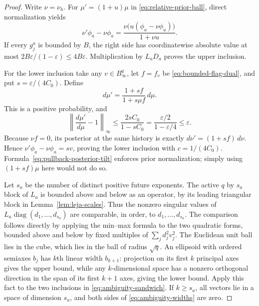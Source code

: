 \documentclass[11pt]{amsart}
\theoremstyle{definition}\newtheorem{definition}[theorem]{Definition}
\theoremstyle{remark}\newtheorem{remark}[theorem]{Remark}
\begin{document}
\begin{proof}
Write $\nu=\nu_h$. For $\mu'=(1+u)\mu$ in
\eqref{eq:relative-prior-ball}, direct normalization yields
\[
 \nu'\phi_a-\nu\phi_a
 =\frac{\nu\bigl(u(\phi_a-\nu\phi_a)\bigr)}{1+\nu u}.
\]
If every $g_j^a$ is bounded by $B$, the right side has coordinatewise
absolute value at most $2B\varepsilon/(1-\varepsilon)\le4B\varepsilon$.
Multiplication by $L_aD_a$ proves the upper inclusion.

For the lower inclusion take any $v\in B_\infty^q$, let $f=f_v$ be
\eqref{eq:bounded-flag-dual}, and put $s=\varepsilon/(4C_0)$. Define
\begin{equation}\label{eq:pullback-posterior-tilt}
 d\mu' =\frac{1+s f}{1+s\mu f}\,d\mu.
\end{equation}
This is a positive probability, and
\[
 \left\|\frac{d\mu'}{d\mu}-1\right\|_\infty
 \le\frac{2s C_0}{1-s C_0}
 =\frac{\varepsilon/2}{1-\varepsilon/4}\le\varepsilon.
\]
Because $\nu f=0$, its posterior at the same history is exactly
$d\nu'=(1+s f)\,d\nu$. Hence
$\nu'\phi_a-\nu\phi_a=s v$, proving the lower inclusion with
$c=1/(4C_0)$. Formula~\eqref{eq:pullback-posterior-tilt} enforces prior
normalization; simply using $(1+s f)\mu$ here would not do so.

Let $s_a$ be the number of distinct positive future exponents. The active
$q$ by $s_a$ block of $L_a$ is bounded above and below as an operator,
by its leading triangular block in Lemma~\ref{lem:leja-scales}.
Thus the nonzero singular values of
$L_a\operatorname{diag}(d_1,\ldots,d_{s_a})$ are comparable, in order,
to $d_1,\ldots,d_{s_a}$. The comparison follows directly by applying
the min--max formula to the two quadratic forms, bounded above and below
by fixed multiples of $\sum_jd_j^2v_j^2$.
The Euclidean unit ball lies in the cube, which lies in the ball of
radius $\sqrt q$. An ellipsoid with ordered semiaxes $b_j$ has $k$th
linear width $b_{k+1}$: projection on its first $k$ principal axes gives
the upper bound, while any $k$-dimensional space has a nonzero
orthogonal direction in the span of its first $k+1$ axes, giving the
lower bound. Apply this fact to the two inclusions in
\eqref{eq:ambiguity-sandwich}. If $k\ge s_a$, all vectors lie in a
space of dimension $s_a$, and both sides of
\eqref{eq:ambiguity-widths} are zero.
\end{proof}
\end{document}
